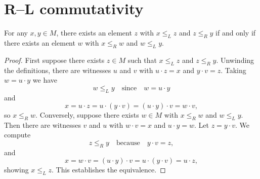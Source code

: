 \section{R--L commutativity}

\begin{lemma}
\label{lem:rLE_lLE_comm}
For any \(x,y \in M\), there exists an element \(z\) with \(x \le_L z\) and \(z \le_R y\) if and only if there exists an element \(w\) with \(x \le_R w\) and \(w \le_L y\).
\leanok
{}
\end{lemma}
\begin{proof}
\leanok
First suppose there exists \(z\in M\) such that \(x \le_L z\) and \(z \le_R y\).  Unwinding the definitions, there are witnesses \(u\) and \(v\) with \(u\cdot z = x\) and \(y\cdot v = z\).  Taking \(w = u\cdot y\) we have
\[
  w \le_L y \quad\text{since}\quad w = u\cdot y
\]
and
\[
  x = u\cdot z = u\cdot (y\cdot v) = (u\cdot y)\cdot v = w\cdot v,
\]
so \(x \le_R w\).  Conversely, suppose there exists \(w\in M\) with \(x \le_R w\) and \(w \le_L y\).  Then there are witnesses \(v\) and \(u\) with \(w\cdot v = x\) and \(u\cdot y = w\).  Let \(z = y\cdot v\).  We compute
\[
  z \le_R y \quad\text{because}\quad y\cdot v = z,
\]
and
\[
  x = w\cdot v = (u\cdot y)\cdot v = u\cdot (y\cdot v) = u\cdot z,
\]
showing \(x \le_L z\).  This establishes the equivalence.
\end{proof}

